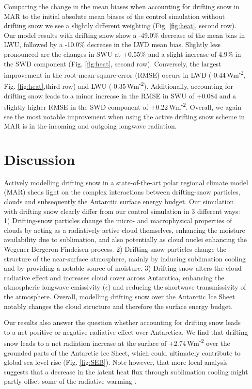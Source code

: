 \documentclass[draft]{agujournal2019}
\begin{document}
Comparing the change in the mean biases when accounting for drifting snow in MAR to the initial absolute mean biases of the control simulation without drifting snow we see a slightly different weighting (Fig. \ref{fig:heat}, second row). Our model results with drifting snow show a -49.0\% decrease of the mean bias in LWU, followed by a -10.0\% decrease in the LWD mean bias. Slightly less pronounced are the changes in SWU at +0.55\% and a slight increase of 4.9\% in the SWD component (Fig. \ref{fig:heat}, second row). Conversely, the largest improvement in the root-mean-square-error (RMSE) occurs in LWD (-0.44\,Wm\textsuperscript{-2}, Fig. \ref{fig:heat},third row) and LWU (-0.35\,Wm\textsuperscript{-2}).  Additionally, accounting for drifting snow leads to a minor increase in the RMSE in SWU of +0.084 and a slightly higher RMSE in the SWD component of +0.22\,Wm\textsuperscript{-2}. Overall, we again see the most notable improvement when using the active drifting snow scheme in MAR is in the incoming and outgoing longwave radiation.

\section*{Discussion}

Actively modelling drifting snow in a state-of-the-art polar regional climate model (MAR) sheds light on the complex interactions between drifting-snow particles, clouds and subsequently the Antarctic surface energy budget. Our simulation with drifting snow clearly differ from our control simulation in 3 different ways:
1) Drifting-snow particles change the micro- and macrophysical properties of clouds by acting as a radiatively active cloud themselves, enhancing the moisture availability due to sublimation, and also potentially as cloud nuclei enhancing the Wegener-Bergeron-Findeisen process.
2) Drifting-snow particles change the structure of the near-surface atmosphere, mainly by inducing sublimation cooling and by providing a notable source of moisture.
3) Drifting snow alters the cloud radiative effect and increases cloud cover across Antarctica, enhancing the atmospheric longwave emissivity ($\epsilon$) and reducing the shortwave transmissivity of the atmosphere. 
Overall, modelling drifting snow over the Antarctic Ice Sheet notably changes the cloud structure and therefore the surface energy budget.

Our results also answer the question whether accounting for drifting snow leads to a net positive or negative radiative effect over Antarctica. We find that drifting snow leads to a net radiation increase at the surface of +2.74\,Wm\textsuperscript{-2} over the grounded parts of the Antarctic Ice Sheet, which could ultimately contribute to global sea level rise (Fig. \ref{fig:SEB}). Note however, that more local analysis suggests that a decrease in the latent heat flux through sublimation cooling might partly offset some of the radiative warming \cite{Letoumelin2020}.
\end{document}
